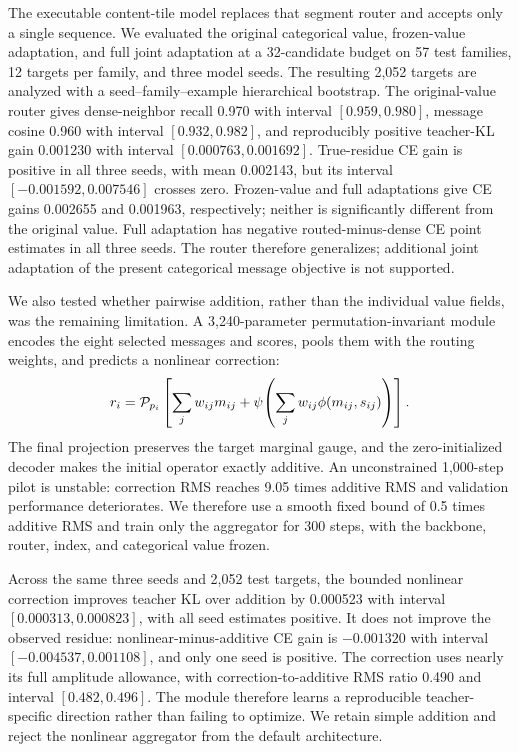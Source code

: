 \documentclass[10pt]{article}
\begin{document}
The executable content-tile model replaces that segment router and accepts only a single
sequence.  We evaluated the original categorical value, frozen-value adaptation, and full joint
adaptation at a 32-candidate budget on 57 test families, 12 targets per family, and three model
seeds.  The resulting 2,052 targets are analyzed with a seed--family--example hierarchical
bootstrap.  The original-value router gives dense-neighbor recall 0.970 with interval
$[0.959,0.980]$, message cosine 0.960 with interval $[0.932,0.982]$, and reproducibly positive
teacher-KL gain 0.001230 with interval $[0.000763,0.001692]$.  True-residue CE gain is positive
in all three seeds, with mean 0.002143, but its interval $[-0.001592,0.007546]$ crosses zero.
Frozen-value and full adaptations give CE gains 0.002655 and 0.001963, respectively; neither is
significantly different from the original value.  Full adaptation has negative
routed-minus-dense CE point estimates in all three seeds.  The router therefore generalizes;
additional joint adaptation of the present categorical message objective is not supported.

We also tested whether pairwise addition, rather than the individual value fields, was the
remaining limitation.  A 3,240-parameter permutation-invariant module encodes the eight selected
messages and scores, pools them with the routing weights, and predicts a nonlinear correction:
\begin{equation}
r_i={\cal P}_{p_i}\left[\sum_j w_{ij}m_{ij}
+\psi\!\left(\sum_j w_{ij}\phi(m_{ij},s_{ij})\right)\right].
\label{eq:set-aggregation}
\end{equation}
The final projection preserves the target marginal gauge, and the zero-initialized decoder makes
the initial operator exactly additive.  An unconstrained 1,000-step pilot is unstable: correction
RMS reaches 9.05 times additive RMS and validation performance deteriorates.  We therefore use a
smooth fixed bound of 0.5 times additive RMS and train only the aggregator for 300 steps, with the
backbone, router, index, and categorical value frozen.

Across the same three seeds and 2,052 test targets, the bounded nonlinear correction improves
teacher KL over addition by 0.000523 with interval $[0.000313,0.000823]$, with all seed estimates
positive.  It does not improve the observed residue: nonlinear-minus-additive CE gain is
$-0.001320$ with interval $[-0.004537,0.001108]$, and only one seed is positive.  The correction
uses nearly its full amplitude allowance, with correction-to-additive RMS ratio 0.490 and interval
$[0.482,0.496]$.  The module therefore learns a reproducible teacher-specific direction rather
than failing to optimize.  We retain simple addition and reject the nonlinear aggregator from the
default architecture.
\end{document}
